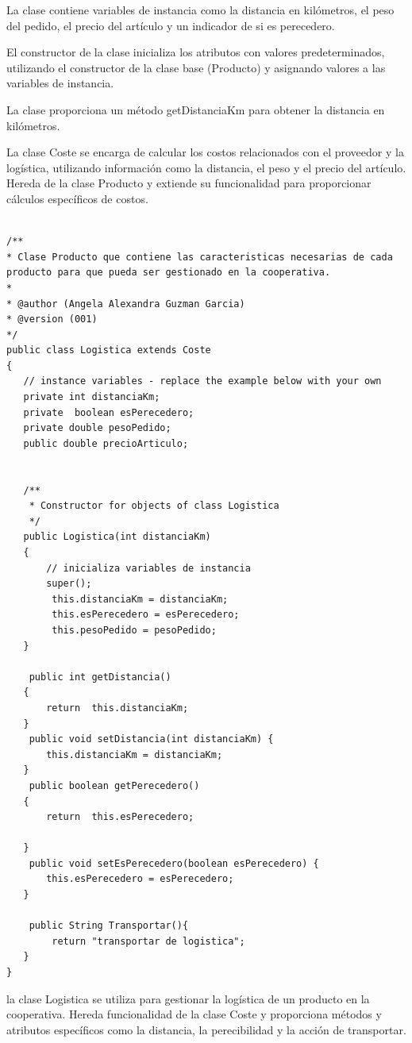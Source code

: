 \documentclass[10pt,a4paper]{article}
\def\StartLineAt#1{\lstset{firstnumber=#1}}
\begin{document}
La clase contiene variables de instancia como la distancia en kilómetros, el peso del pedido, el precio del artículo y un indicador de si es perecedero.

El constructor de la clase inicializa los atributos con valores predeterminados, utilizando el constructor de la clase base (Producto) y asignando valores a las variables de instancia.

La clase proporciona un método getDistanciaKm para obtener la distancia en kilómetros.

La clase Coste se encarga de calcular los costos relacionados con el proveedor y la logística, utilizando información como la distancia, el peso y el precio del artículo. Hereda de la clase Producto y extiende su funcionalidad para proporcionar cálculos específicos de costos.

\StartLineAt{1}
\begin{lstlisting}[style=Java]
 
/**
* Clase Producto que contiene las caracteristicas necesarias de cada producto para que pueda ser gestionado en la cooperativa.
* 
* @author (Angela Alexandra Guzman Garcia) 
* @version (001)
*/
public class Logistica extends Coste
{
   // instance variables - replace the example below with your own
   private int distanciaKm;
   private  boolean esPerecedero;
   private double pesoPedido;
   public double precioArticulo;


   /**
    * Constructor for objects of class Logistica
    */
   public Logistica(int distanciaKm)
   {
       // inicializa variables de instancia
       super(); 
        this.distanciaKm = distanciaKm;
        this.esPerecedero = esPerecedero;
        this.pesoPedido = pesoPedido;
   }
   
    public int getDistancia()
   {
       return  this.distanciaKm;
   }
    public void setDistancia(int distanciaKm) {
       this.distanciaKm = distanciaKm;
   }
    public boolean getPerecedero()
   {
       return  this.esPerecedero;
       
   }
    public void setEsPerecedero(boolean esPerecedero) {
       this.esPerecedero = esPerecedero;
   }
   
    public String Transportar(){
        return "transportar de logistica";
   }
}
\end{lstlisting}

la clase Logistica se utiliza para gestionar la logística de un producto en la cooperativa. Hereda funcionalidad de la clase Coste y proporciona métodos y atributos específicos como la distancia, la perecibilidad y la acción de transportar.
\end{document}
